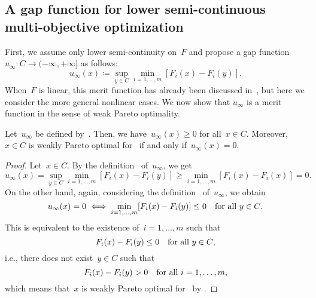 \documentclass[../../main]{subfiles}
\begin{document}
\subsection{A gap function for lower semi-continuous multi-objective optimization} 
First, we assume only lower semi-continuity on~$F$ and propose a gap function~$u_\infty \colon C \to (-\infty, +\infty]$ as follows:
\begin{equation} \label{eq:gap_MO}
    u_\infty(x) \coloneqq \sup_{y \in C} \min_{i = 1, \dots, m} [ F_i(x) - F_i(y) ]
    .\end{equation}
When~$F$ is linear, this merit function has already been discussed in~\cite{Liu2009}, but here we consider the more general nonlinear cases.
We now show that $u_\infty$ is a merit function in the sense of weak Pareto optimality.
\begin{theorem} 
    Let~$u_\infty$ be defined by~.
    Then, we have~$u_\infty(x) \ge 0$ for all~$x \in C$.
    Moreover,~$x \in C$ is weakly Pareto optimal for~ if and only if~$u_\infty(x) = 0$.
\end{theorem}
\begin{proof}
    Let~$x \in C$.
    By the definition~ of~$u_\infty$, we get
    \begin{equation}
        u_\infty(x) = \sup_{y \in C} \min_{i = 1, \dots, m} [ F_i(x) - F_i(y) ]
        \ge \min_{i = 1, \dots, m} [ F_i(x) - F_i(x) ] = 0
        .\end{equation}
    On the other hand, again, considering the definition~ of~$u_\infty$, we obtain
    \begin{equation}
        u_\infty(x) = 0 \iff \min_{i = 1, \dots, m} [ F_i(x) - F_i(y) ] \le 0 \quad \text{for all~$y \in C$}
        .\end{equation}
    This is equivalent to the existence of~$i = 1, \dots, m$ such that
    \begin{equation}
        F_i(x) - F_i(y) \le 0 \quad \text{for all~$y \in C$}
        ,\end{equation}
    i.e., there does not exist~$y \in C$ such that
    \begin{equation}
        F_i(x) - F_i(y) > 0 \quad \text{for all~$i = 1, \dots, m$}
        ,\end{equation}
    which means that~$x$ is weakly Pareto optimal for~ by .
\end{proof}
\end{document}
